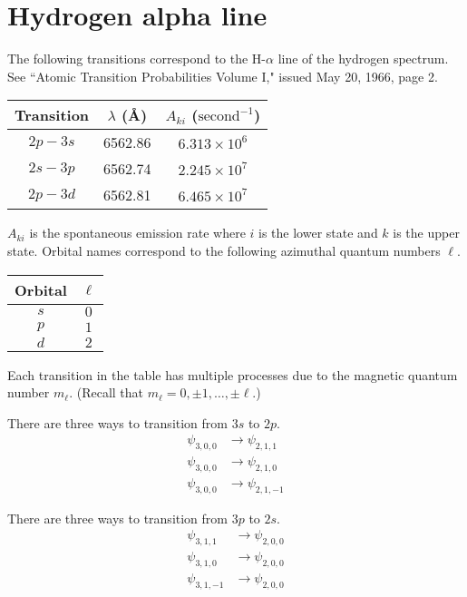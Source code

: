 

\section*{Hydrogen alpha line}

The following transitions correspond to the H-$\alpha$ line of the hydrogen spectrum.
See ``Atomic Transition Probabilities Volume I," issued May 20, 1966, page 2.

\begin{center}
\begin{tabular}{|c|c|c|}
\hline
Transition & $\lambda$ (\AA) & $A_{ki}$ ($\text{second}^{-1}$)
\\
\hline
$2p-3s$ & 6562.86 & $6.313\times10^6$
\\
$2s-3p$ & 6562.74 & $2.245\times10^7$
\\
$2p-3d$ & 6562.81 & $6.465\times10^7$
\\
\hline
\end{tabular}
\end{center}

$A_{ki}$ is the spontaneous emission rate where $i$ is the lower state and $k$ is the upper state.
Orbital names correspond to the following azimuthal quantum numbers $\ell$.
\begin{center}
\begin{tabular}{|c|c|}
\hline
Orbital & $\ell$
\\
\hline
$s$ & $0$
\\
$p$ & $1$
\\
$d$ & $2$
\\
\hline
\end{tabular}
\end{center}

Each transition in the table has multiple processes due to the magnetic quantum number $m_\ell$.
(Recall that $m_\ell=0,\pm1,\ldots,\pm\ell$.)

\bigskip
There are three ways to transition from $3s$ to $2p$.
\begin{align*}
\psi_{3,0,0}&\rightarrow\psi_{2,1,1}
\\
\psi_{3,0,0}&\rightarrow\psi_{2,1,0}
\\
\psi_{3,0,0}&\rightarrow\psi_{2,1,-1}
\end{align*}

There are three ways to transition from $3p$ to $2s$.
\begin{align*}
\psi_{3,1,1}&\rightarrow\psi_{2,0,0}
\\
\psi_{3,1,0}&\rightarrow\psi_{2,0,0}
\\
\psi_{3,1,-1}&\rightarrow\psi_{2,0,0}
\end{align*}

